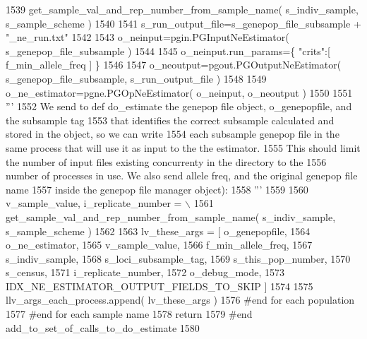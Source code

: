 \begin{DoxyCode}
1539                         get\_sample\_val\_and\_rep\_number\_from\_sample\_name( s\_indiv\_sample, s\_sample\_scheme )
1540 
1541             s\_run\_output\_file=s\_genepop\_file\_subsample + \textcolor{stringliteral}{"\_ne\_run.txt"}
1542 
1543             o\_neinput=pgin.PGInputNeEstimator( s\_genepop\_file\_subsample )
1544 
1545             o\_neinput.run\_params=\{ \textcolor{stringliteral}{"crits"}:[ f\_min\_allele\_freq ]  \}
1546 
1547             o\_neoutput=pgout.PGOutputNeEstimator( s\_genepop\_file\_subsample, s\_run\_output\_file ) 
1548 
1549             o\_ne\_estimator=pgne.PGOpNeEstimator( o\_neinput, o\_neoutput ) 
1550             
1551             \textcolor{stringliteral}{'''}
1552 \textcolor{stringliteral}{            We send to def do\_estimate the genepop file object, o\_genepopfile, and the subsample tag}
1553 \textcolor{stringliteral}{            that identifies the correct subsample calculated and stored in the object, so we can write}
1554 \textcolor{stringliteral}{            each subsample genepop file in the same process that will use it as input to the the estimator.}
1555 \textcolor{stringliteral}{            This should limit the number of input files existing concurrenty in the directory to the }
1556 \textcolor{stringliteral}{            number of processes in use.  We also send allele freq, and the original genepop file name }
1557 \textcolor{stringliteral}{            inside the genepop file manager object):}
1558 \textcolor{stringliteral}{            '''}
1559 
1560             v\_sample\_value, i\_replicate\_number = \(\backslash\)
1561                     get\_sample\_val\_and\_rep\_number\_from\_sample\_name( s\_indiv\_sample, s\_sample\_scheme )
1562 
1563             lv\_these\_args = [ o\_genepopfile,  
1564                                 o\_ne\_estimator, 
1565                                 v\_sample\_value, 
1566                                 f\_min\_allele\_freq, 
1567                                 s\_indiv\_sample, 
1568                                 s\_loci\_subsample\_tag,
1569                                 s\_this\_pop\_number, 
1570                                 s\_census,
1571                                 i\_replicate\_number, 
1572                                 o\_debug\_mode,
1573                                 IDX\_NE\_ESTIMATOR\_OUTPUT\_FIELDS\_TO\_SKIP ]
1574 
1575             llv\_args\_each\_process.append( lv\_these\_args )
1576         \textcolor{comment}{#end for each population}
1577     \textcolor{comment}{#end for each sample name}
1578     \textcolor{keywordflow}{return}
1579 \textcolor{comment}{#end add\_to\_set\_of\_calls\_to\_do\_estimate}
1580 
\end{DoxyCode}
